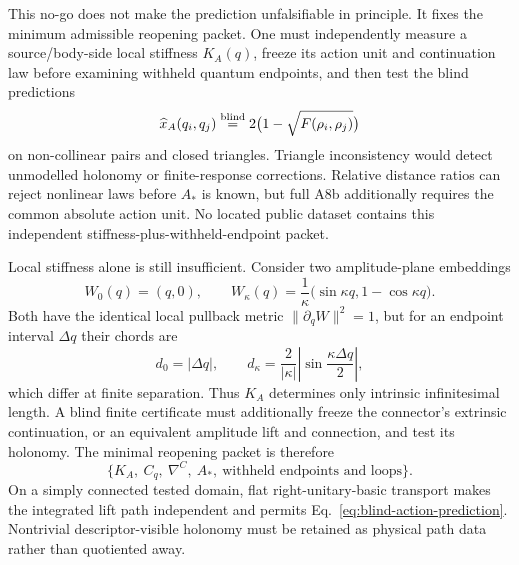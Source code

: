 This no-go does not make the prediction unfalsifiable in principle.  It fixes
the minimum admissible reopening packet.  One must independently measure a
source/body-side local stiffness $K_A(q)$, freeze its action unit and
continuation law before examining withheld quantum endpoints, and then test
the blind predictions
\begin{equation}
 \widehat x_A(q_i,q_j)
 \stackrel{\rm blind}{=}
 2\bigl(1-\sqrt{F(\rho_i,\rho_j)}\bigr)
 \label{eq:blind-action-prediction}
\end{equation}
on non-collinear pairs and closed triangles.  Triangle inconsistency would
detect unmodelled holonomy or finite-response corrections.  Relative
distance ratios can reject nonlinear laws before $A_*$ is known, but full
A8b additionally requires the common absolute action unit.  No located public
dataset contains this independent stiffness-plus-withheld-endpoint packet.

Local stiffness alone is still insufficient.  Consider two amplitude-plane
embeddings
\begin{equation}
 W_0(q)=(q,0),
 \qquad
 W_\kappa(q)=\frac{1}{\kappa}
 \bigl(\sin\kappa q,1-\cos\kappa q\bigr).
 \label{eq:isometric-curve-countermodel}
\end{equation}
Both have the identical local pullback metric
$\|\partial_qW\|^2=1$, but for an endpoint interval $\Delta q$ their chords
are
\begin{equation}
 d_0=|\Delta q|,
 \qquad
 d_\kappa=\frac{2}{|\kappa|}
 \left|\sin\frac{\kappa\Delta q}{2}\right|,
\end{equation}
which differ at finite separation.  Thus $K_A$ determines only intrinsic
infinitesimal length.  A blind finite certificate must additionally freeze
the connector's extrinsic continuation, or an equivalent amplitude lift and
connection, and test its holonomy.  The minimal reopening packet is therefore
\begin{equation}
 \boxed{\{K_A,\ C_q,\ \nabla^C,\ A_*,\ \text{withheld endpoints and loops}\}}.
 \label{eq:minimal-blind-packet}
\end{equation}
On a simply connected tested domain, flat right-unitary-basic transport makes
the integrated lift path independent and permits
Eq.~\eqref{eq:blind-action-prediction}.  Nontrivial descriptor-visible
holonomy must be retained as physical path data rather than quotiented away.

